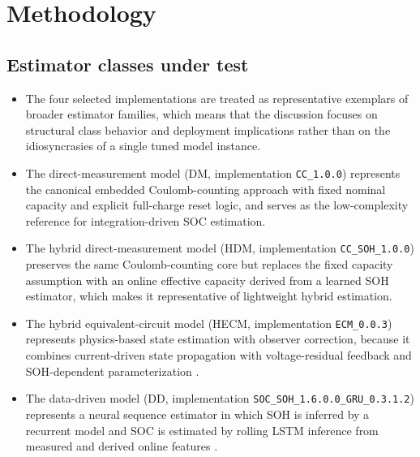 \documentclass[review]{elsarticle}
\begin{document}
\section{Methodology}
\subsection{Estimator classes under test}
\begin{itemize}[leftmargin=*]
    \item The four selected implementations are treated as representative exemplars of broader estimator families, which means that the discussion focuses on structural class behavior and deployment implications rather than on the idiosyncrasies of a single tuned model instance.
    \item The direct-measurement model (DM, implementation \texttt{CC\_1.0.0}) represents the canonical embedded Coulomb-counting approach with fixed nominal capacity and explicit full-charge reset logic, and serves as the low-complexity reference for integration-driven SOC estimation.
    \item The hybrid direct-measurement model (HDM, implementation \texttt{CC\_SOH\_1.0.0}) preserves the same Coulomb-counting core but replaces the fixed capacity assumption with an online effective capacity derived from a learned SOH estimator, which makes it representative of lightweight hybrid estimation.
    \item The hybrid equivalent-circuit model (HECM, implementation \texttt{ECM\_0.0.3}) represents physics-based state estimation with observer correction, because it combines current-driven state propagation with voltage-residual feedback and SOH-dependent parameterization \cite{gaoEnhancedStateofchargeEstimation2022,guoSystematicReviewElectrochemical2024}.
    \item The data-driven model (DD, implementation \texttt{SOC\_SOH\_1.6.0.0\_GRU\_0.3.1.2}) represents a neural sequence estimator in which SOH is inferred by a recurrent model and SOC is estimated by rolling LSTM inference from measured and derived online features \cite{mondalEstimatingStateofChargeLithiumIon2024,yaoSmarterBatteryManagement2025b}.
\end{itemize}
\end{document}
